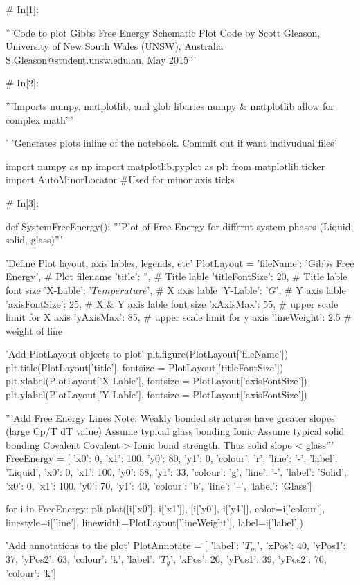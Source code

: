 \documentclass[a4paper,8pt]{article}
\begin{document}
\begin{python}
# In[1]:

'''Code to plot Gibbs Free Energy Schematic Plot
Code by Scott Gleason, University of New South Wales (UNSW), Australia 
S.Gleason@student.unsw.edu.au, May 2015'''


# In[2]:

'''Imports numpy, matplotlib, and glob libaries 
numpy & matplotlib allow for complex math'''

'%
'Generates plots inline of the notebook. Commit out if want indivudual files'

import numpy as np
import matplotlib.pyplot as plt
from matplotlib.ticker import AutoMinorLocator #Used for minor axis ticks


# In[3]:

def SystemFreeEnergy():
'''Plot of Free Energy for differnt system phases (Liquid, solid, glass)'''

'Define Plot layout, axis lables, legends, etc'
PlotLayout = {'fileName': 'Gibbs Free Energy', # Plot filename 
	'title': '', # Title lable
	'titleFontSize': 20, # Title lable font size
	'X-Lable': '$Temperature$', # X axis lable
	'Y-Lable': '$G$', # Y axis lable
	'axisFontSize': 25, # X & Y axis lable font size
	'xAxisMax': 55, # upper scale limit for X axis
	'yAxisMax': 85, # upper scale limit for y axis
	'lineWeight': 2.5 # weight of line
}

'Add PlotLayout objects to plot'
plt.figure(PlotLayout['fileName'])
plt.title(PlotLayout['title'], fontsize = PlotLayout['titleFontSize'])
plt.xlabel(PlotLayout['X-Lable'], fontsize = PlotLayout['axisFontSize'])
plt.ylabel(PlotLayout['Y-Lable'], fontsize = PlotLayout['axisFontSize'])

'''Add Free Energy Lines
Note: Weakly bonded structures have greater slopes (large Cp/T dT value)
Assume typical glass bonding Ionic 
Assume typical solid bonding Covalent
Covalent > Ionic bond strength. Thus solid slope < glass''' 
FreeEnergy = [
{'x0': 0, 'x1': 100, 'y0': 80, 'y1': 0, 
	'colour': 'r', 'line': '-', 'label': 'Liquid'},
{'x0': 0, 'x1': 100, 'y0': 58, 'y1': 33,
	'colour': 'g', 'line': '-', 'label': 'Solid'},
{'x0': 0, 'x1': 100, 'y0': 70, 'y1': 40,
	'colour': 'b', 'line': '--', 'label': 'Glass'}]

for i in FreeEnergy:
plt.plot([i['x0'], i['x1']], [i['y0'], i['y1']],
color=i['colour'], linestyle=i['line'], 
linewidth=PlotLayout['lineWeight'],
label=i['label'])

'Add annotations to the plot'
PlotAnnotate = [
{'label': '$T_{m}$', 'xPos': 40, 'yPos1': 37, 'yPos2': 63, 'colour': 'k'},
{'label': '$T_{g}$', 'xPos': 20, 'yPos1': 39, 'yPos2': 70, 'colour': 'k'}]


\end{python}
\end{document}
